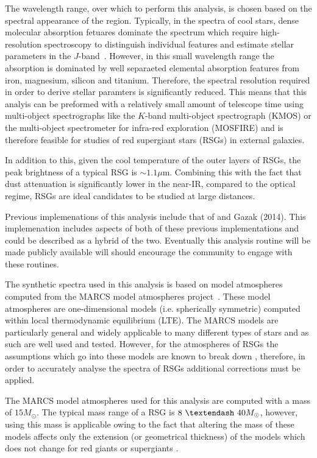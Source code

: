 The wavelength range, over which to perform this analysis,
is chosen based on the spectral appearance of the region.
Typically, in the spectra of cool stars, dense molecular absorption fetuares dominate the spectrum which require high-resolution spectroscopy to distinguish individual features and estimate stellar parameters in the $J$-band~\citep{Cunha07, Davies09a, Davies09b}.
However, in this small wavelength range the absorption is dominated by well separaeted elemental absorption features from iron, magnesium, silicon and titanium.
Therefore, the spectral resolution required in order to derive stellar paramters is significantly reduced.
This means that this analyis can be preformed with a relatively small amount of telescope time using multi-object spectrographs like the $K$-band multi-object spectrograph (KMOS)
or the multi-object spectrometer for infra-red exploration (MOSFIRE) and is therefore feasible for studies of red supergiant stars (RSGs) in external galaxies.

In addition to this, given the cool temperature of the outer layers of RSGs,
the peak brightness of a typical RSG is $\sim1.1\mu$m.
Combining this with the fact that dust attenuation is significantly lower in the near-IR, compared to the optical regime, RSGs are ideal candidates to be studied at large distances.

Previous implemenations of this analysis include that of
\cite{2010MNRAS.407.1203D} and Gazak (2014).
This implemenation includes aspects of both of these previous implementations and could be described as a hybrid of the two.
Eventually this analysis routine will be made publicly available will should encourage the community to engage with these routines.



The synthetic spectra used in this analysis is based on model atmospheres computed from the
MARCS model atmospheres project~\citep{2008A&A...486..951G}.
These model atmospheres are one-dimensional models (i.e. spherically symmetric)
computed within local thermodynamic equilibrium (LTE).
The MARCS models are particularly general and widely applicable to many different types of stars and as such are well used and tested.
However, for the atmospheres of RSGs the assumptions which go into these models are known to break down
\citep{2002AN....323..213F,2010ASPC..425..124P},
therefore, in order to accurately analyse the spectra of RSGs additional corrections must be applied.

The MARCS model atmospheres used for this analysis are computed with a mass of $15M_{\odot}$.
The typical mass range of a RSG is $8~\textendash~40M_{\odot}$, however,
using this mass is applicable owing to the fact that altering the mass of these models affects only the extension
(or geometrical thickness) of the models which does not change for red giants or supergiants
\citep{2010MNRAS.407.1203D}.

